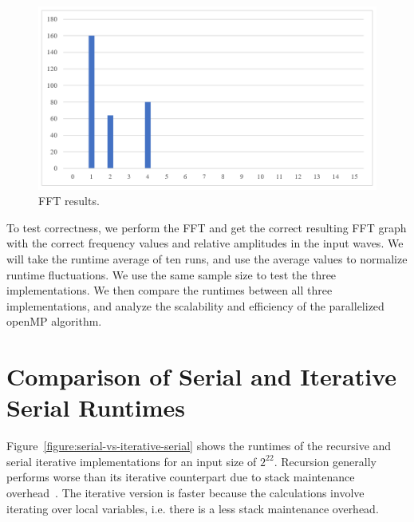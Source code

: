\documentclass{amsart}
\begin{document}
\begin{figure}[htbp]
\caption{FFT results.}
\begin{center}
\includegraphics{fft-result.PNG}
\end{center}
\label{figure:fft-result}
\end{figure}

To test correctness, we perform the FFT and get the correct resulting FFT graph with the correct frequency values and relative amplitudes in the input waves. We will take the runtime average of ten runs, and use the average values to normalize runtime fluctuations. We use the same sample size to test the three implementations. We then compare the runtimes between all three implementations, and analyze the scalability and efficiency of the parallelized openMP algorithm.

\section{Comparison of Serial and Iterative Serial Runtimes}

Figure~\ref{figure:serial-vs-iterative-serial} shows the runtimes of the recursive and serial iterative implementations for an input size of $2^{22}$. Recursion generally performs worse than its iterative counterpart due to stack maintenance overhead~\cite{bryant}. The iterative version is faster because the calculations involve iterating over local variables, i.e. there is a less stack maintenance overhead.
\end{document}
